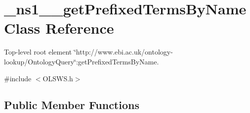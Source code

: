\hypertarget{class__ns1____getPrefixedTermsByName}{
\section{\_\-ns1\_\-\_\-getPrefixedTermsByName Class Reference}
\label{class__ns1____getPrefixedTermsByName}
}


Top-\/level root element \char`\"{}http://www.ebi.ac.uk/ontology-\/lookup/OntologyQuery\char`\"{}:getPrefixedTermsByName.  




{\ttfamily \#include $<$OLSWS.h$>$}

\subsection*{Public Member Functions}
